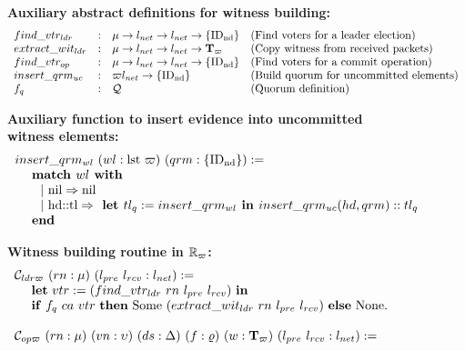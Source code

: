 \begin{figure}
\raggedright
\textbf{Auxiliary abstract definitions for witness building:} \\
$$
\begin{array}{llll}
find\_vtr_{ldr} &:& \termnum \rightarrow \networklog \rightarrow \networklog \rightarrow  \set{\nodeid} & \mbox{(Find voters for a leader election)}\\
extract\_wit_{ldr} &:& \termnum \rightarrow \networklog \rightarrow \networklog \rightarrow  \witnesstree & \mbox{(Copy witness from received packets)}\\
find\_vtr_{op} &:& \termnum \rightarrow \networklog \rightarrow \networklog \rightarrow  \set{\nodeid} & \mbox{(Find voters for a commit operation)}\\
insert\_qrm_{uc} &:& \witness \networklog \rightarrow  \set{\nodeid} & \mbox{(Build quorum for uncommitted elements)}\\
f_{q} &:&  \isquorums & \mbox{(Quorum definition)}\\
\end{array}
$$
\raggedright
\textbf{Auxiliary function to insert evidence into uncommitted witness elements:}\\
$$
\begin{array}{l}
insert\_qrm_{wl}\ (wl : \text{lst } \witness)\ (qrm:  \set{\nodeid}) :=\\
\ \ \ \  \text{\textbf{match }} wl \text{\textbf{ with}} \\ 
\ \ \ \  \ \ \vert \ \text{nil} \Rightarrow \text{nil} \\
\ \ \ \  \ \   \vert \ \text{hd::tl} \Rightarrow 
 \text{\textbf{ let }} tl_{q} :=  insert\_qrm_{wl} \text{\textbf{ in }} 
insert\_qrm_{uc}(hd, qrm)::tl_{q}  \\
\ \ \ \ \text{\textbf{end}} \\
\end{array}
$$
\raggedright
\textbf{Witness building routine in} ${\replay}_{\witness}$\textbf{:}  \\
$$
\begin{array}{ll}
\ldrwcons \ (rn: \termnum) \ (l_{pre}\ l_{rcv}: \networklog) := \\
\ \ \ \ \mbox{\textbf{let}}\ vtr := (find\_vtr_{ldr} \ rn \ l_{pre} \ l_{rcv})\  \mbox{\textbf{in}} \\ 
\ \ \ \ \mbox{\textbf{if}} \ f_{q} \ ca \ vtr \ \mbox{\textbf{then}}\
  \text{Some}\ (extract\_wit_{ldr} \ rn \ l_{pre} \ l_{rcv})\   \mbox{\textbf{else}} \  \text{None}.\\
\\
\opwcons\ (rn: \termnum)\ (vn :\seqnum)\ (ds : \dsvalue)\ (f: \updatefunc)\ (w :\witnesstree)\ (l_{pre}\ l_{rcv}: \networklog) := \\

\end{array}$$
\end{figure}
